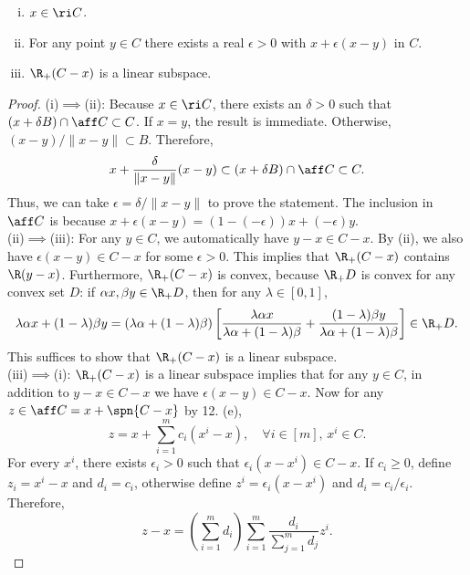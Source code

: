 \documentclass[12pt, letterpaper]{article}
\numberwithin{equation}{subsection}
\begin{document}
\begin{enumerate}[(a)]
\begin{enumerate}[(i)]
\item $x\in\ri C$. 
\item For any point $y\in C$ there exists a real $\epsilon > 0$ with 
$x+\epsilon(x-y)$ in $C$.
\item $\R_+(C-x)$ is a linear subspace.
\end{enumerate}
\begin{proof}
(i)$\implies$(ii): Because $x\in\ri C$, there exists an $\delta > 0$ 
such that $(x+\delta B)\cap \aff C \subset C$. If $x=y$, the result 
is immediate. Otherwise, $(x-y)/\|x-y\|\subset B$. Therefore, 
\begin{equation*}
x + \frac{\delta}{\|x-y\|}(x-y) \subset (x+\delta B)\cap \aff C
\subset C.
\end{equation*}
Thus, we can take $\epsilon = \delta/\|x-y\|$ to prove the statement.
The inclusion in $\aff C$ is because $x+\epsilon(x-y) = 
(1-(-\epsilon))x + (-\epsilon)y$. \\
(ii)$\implies$(iii): For any $y\in C$, we automatically have 
$y-x\in C-x$. By (ii), we also have $\epsilon(x-y)\in C-x$ for 
some $\epsilon > 0$. This implies that $\R_+(C-x)$ contains 
$\R(y-x)$. Furthermore, $\R_+(C-x)$ is convex, because $\R_+D$ is 
convex for any convex set $D$: if $\alpha x, \beta y\in \R_+D$, 
then for any $\lambda\in[0,1]$,
\begin{equation*}
\lambda \alpha x + (1-\lambda)\beta y = (\lambda\alpha + (1-\lambda)
\beta)\left[\frac{\lambda\alpha x}{\lambda\alpha+(1-\lambda)\beta}
+ \frac{(1-\lambda)\beta y}{\lambda\alpha + (1-\lambda)\beta}\right]
\in \R_+D.
\end{equation*}
This suffices to show that $\R_+(C-x)$ is a linear subspace. \\
(iii)$\implies$(i): 
$\R_+(C-x)$ is a linear subspace implies that for any $y\in C$, 
in addition to $y-x\in C-x$ we have $\epsilon(x-y) \in C-x$. Now for 
any $z\in \aff C = x+\spn{C-x}$ by 12. (e), 
\begin{equation*}
z = x+ \sum_{i=1}^m c_i(x^i-x),\quad \forall i\in[m],\, x^i\in C.
\end{equation*}
For every $x^i$, there exists $\epsilon_i > 0$ such that $\epsilon_i(x-
x^i) \in C-x$. If $c_i\geq 0$, define $z_i=x^i-x$ and $d_i=c_i$, otherwise 
define $z^i = \epsilon_i(x-x^i)$ and $d_i=c_i/\epsilon_i$. Therefore, 
\begin{equation*}
z-x =\left( \sum_{i=1}^m d_i\right)\sum_{i=1}^m
\frac{d_i}{\sum_{j=1}^m d_j} z^i.
\end{equation*}

\end{proof}
\end{enumerate}
\end{document}
